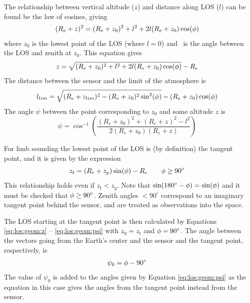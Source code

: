   \label{sec:los:general}

  The relationship between vertical altitude ($z$) and distance along
  LOS ($l$) can be found be the law of cosines, giving
  \begin{equation}
    (R_e+z)^2 = (R_e+z_0)^2 + l^2 + 2l(R_e+z_0)\cos(\phi)
  \end{equation}
  where $z_0$ is the lowest point of the LOS (where $l=0$) and \view\
  is the angle between the LOS and zenith at $z_0$. This equation 
  gives
  \begin{equation}
    z = \sqrt{ (R_e+z_0)^2 + l^2 + 2l(R_e+z_0)\cos(\phi) } - R_e
   \label{eq:los:geom:z}
  \end{equation}
  The distance between the sensor and the limit of the atmosphere is
  \begin{equation}
      l_{lim} = \sqrt{ (R_e+z_{lim})^2 - (R_e+z_0)^2\sin^2(\phi) } - 
                                       (R_e+z_0)\cos(\phi)
   \label{eq:los:geom:llim}
  \end{equation}
  The angle $\psi$ between the point corresponding to $z_0$ and
  some altitude $z$ is
  \begin{equation}
      \psi = \cos^{-1}\left( \frac{(R_e+z_0)^2 + (R_e+z)^2 - l^2}
                                                   {2(R_e+z_0)(R_e+z)} \right) 
   \label{eq:los:geom:psi}
  \end{equation} 



  \label{sec:los:limb}
  
  For limb sounding the lowest point of the LOS is (by definition) the
  tangent point, and it is given by the expression
  \begin{equation}
    z_t = (R_e+z_p)\sin(\phi) - R_e \qquad  \phi\geq90^\circ
   \label{eq:los:ztan}
  \end{equation}
  This relationship holds even if $z_t<z_g$. Note that
  $\sin(180^\circ-\phi)=\sin(\phi)$ and it must be checked that
  $\phi\geq90^\circ$. Zenith angles $<90^\circ$ correspond to an
  imaginary tangent point behind the sensor, and are treated as
  observations into the space.

  The LOS starting at the tangent point is then calculated by 
  Equations \ref{eq:los:geom:z} -- \ref{eq:los:geom:psi} with $z_0 = z_t$
  and $\phi = 90^\circ$. The angle between the vectors going from the
  Earth's center and the sensor and the tangent point, respectively,
  is
  \begin{equation}
    \psi_0 = \phi - 90^\circ
  \end{equation}
  The value of $\psi_0$ is added to the angles given by Equation 
  \ref{eq:los:geom:psi} as the equation in this case gives the angles 
  from the tangent point instead from the sensor.

